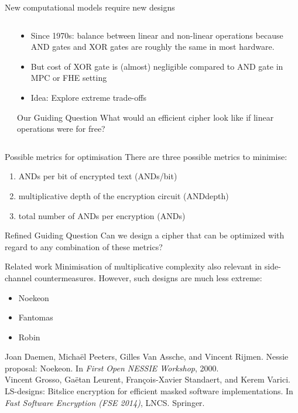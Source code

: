 \documentclass[10pt,compress]{beamer}
\begin{document}
\begin{frame}{New computational models require new designs}
\begin{columns}
\begin{column}{0.25\textwidth}
\end{column}
\begin{column}{0.75\textwidth}
\begin{itemize}
\item Since 1970s: balance between linear and non-linear operations because AND gates and XOR gates are roughly the same in most hardware.
\item But cost of XOR gate is (almost) negligible compared to AND gate in MPC or FHE setting
\item Idea: Explore \alert{extreme} trade-offs
\end{itemize}
\begin{alertblock}{Our Guiding Question}
  What would an efficient cipher look like if linear operations were for free?
\end{alertblock}
\end{column}
\end{columns}
\end{frame}

\begin{frame}{Possible metrics for optimisation}
There are three possible metrics to minimise:
\begin{enumerate}
  \item ANDs per bit of encrypted text (\alert{ANDs/bit})
  \item multiplicative depth of the encryption circuit (\alert{ANDdepth})
  \item total number of ANDs per encryption (\alert{ANDs})
\end{enumerate}
\begin{alertblock}{Refined Guiding Question}
  Can we design a cipher that can be optimized with regard to any combination of these
  metrics?
\end{alertblock}
\end{frame}

\begin{frame}{Related work}
Minimisation of multiplicative complexity also relevant in side-channel countermeasures. However, such designs are much less extreme:
\begin{itemize}
  \item Noekeon
  \item Fantomas
  \item Robin 
\end{itemize}
\vspace{0.3cm}

\footnotesize{
Joan Daemen, Micha\"{e}l Peeters, Gilles Van Assche, and Vincent Rijmen.
Nessie proposal: Noekeon. In \textit{First Open NESSIE Workshop}, 2000.\\[0.3cm]

Vincent Grosso, Ga\"{e}tan Leurent, Fran\c{c}ois-Xavier Standaert, and Kerem Varici. LS-designs: Bitslice encryption for efficient masked software implementations. In \textit{Fast Software Encryption (FSE 2014)}, LNCS. Springer.}
\end{frame}
\end{document}
